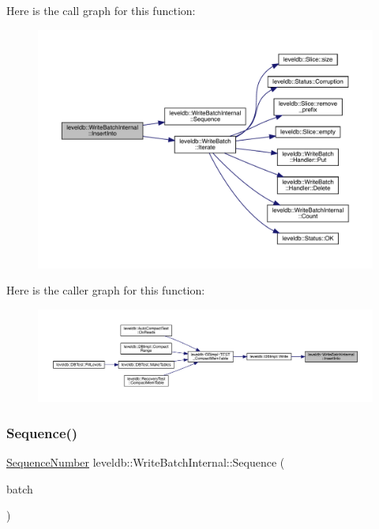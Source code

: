 Here is the call graph for this function\+:
\nopagebreak
\begin{figure}[H]
\begin{center}
\leavevmode
\includegraphics[width=350pt]{classleveldb_1_1_write_batch_internal_a102aae14259fd277e2576338ce3e5551_cgraph}
\end{center}
\end{figure}
Here is the caller graph for this function\+:
\nopagebreak
\begin{figure}[H]
\begin{center}
\leavevmode
\includegraphics[width=350pt]{classleveldb_1_1_write_batch_internal_a102aae14259fd277e2576338ce3e5551_icgraph}
\end{center}
\end{figure}
\mbox{\label{classleveldb_1_1_write_batch_internal_af657c82bd9378b78c35a3a7429f945d4}} 
\subsubsection{\texorpdfstring{Sequence()}{Sequence()}}
{\footnotesize\ttfamily \mbox{\hyperlink{namespaceleveldb_a5481ededd221c36d652c371249f869fa}{Sequence\+Number}} leveldb\+::\+Write\+Batch\+Internal\+::\+Sequence (\begin{DoxyParamCaption}\item[{const \mbox{\hyperlink{classleveldb_1_1_write_batch}{Write\+Batch}} $\ast$}]{batch }\end{DoxyParamCaption})\hspace{0.3cm}{\ttfamily [static]}}

